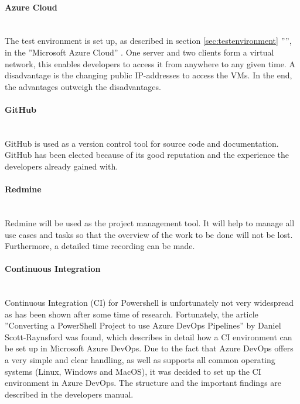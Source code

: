 \paragraph{Azure Cloud}\ \\
The test environment is set up, as described in section \ref{sec:testenvironment} '''', in the ''Microsoft Azure Cloud'' \cite{Azure}. One server and two clients form a virtual network, this enables developers to access it from anywhere to any given time. A disadvantage is the changing public IP-addresses to access the VMs. In the end, the advantages outweigh the disadvantages.

\paragraph{GitHub}\ \\
GitHub \cite{GitHub} is used as a version control tool for source code and documentation. GitHub has been elected because of its good reputation and the experience the developers already gained with.

\paragraph{Redmine}\ \\
Redmine \cite{Redmine} will be used as the project management tool. It will help to manage all use cases and tasks so that the overview of the work to be done will not be lost. Furthermore, a detailed time recording can be made.

\clearpage

\paragraph{Continuous Integration}\ \\
Continuous Integration (CI) for Powershell is unfortunately not very widespread as has been shown after some time of research. Fortunately, the article ''Converting a PowerShell Project to use Azure DevOps Pipelines'' \cite{CI} by Daniel Scott-Raynsford was found, which describes in detail how a CI environment can be set up in Microsoft Azure DevOps. Due to the fact that Azure DevOps offers a very simple and clear handling, as well as supports all common operating systems (Linux, Windows and MacOS), it was decided to set up the CI environment in Azure DevOps. The structure and the important findings are described in the developers manual.

